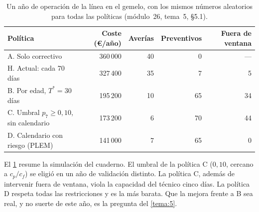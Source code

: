 \begin{table}[h]
\centering\small
\caption{Un año de operación de la línea en el gemelo, con los mismos números aleatorios para todas las políticas (módulo~26, tema~5, §5.1).}\label{tab:politicas}
\setlength{\tabcolsep}{5pt}
\begin{tabular}{@{}lrrrr@{}}
\toprule
Política & Coste (€/año) & Averías & Preventivos & Fuera de ventana \\
\midrule
A. Solo correctivo & 360\,000 & 40 & 0 & --- \\
H. Actual: cada 70 días & 327\,400 & 35 & 7 & 5 \\
B. Por edad, $T^{*}=30$ días & 195\,200 & 10 & 65 & 34 \\
C. Umbral $p_7\ge0{,}10$, sin calendario & 173\,200 & 6 & 70 & 44 \\
D. Calendario con riesgo (PLEM) & 141\,000 & 7 & 65 & 0 \\
\bottomrule
\end{tabular}
\end{table}

El \cref{tab:politicas} resume la simulación del cuaderno. El umbral de la política C ($0{,}10$, cercano a $c_p/c_f$) se eligió en un año de validación distinto. La política C, además de intervenir fuera de ventana, viola la capacidad del técnico cinco días. La política D respeta todas las restricciones y es la más barata. Que la mejora frente a B sea real, y no suerte de este año, es la pregunta del \cref{tema:5}.

